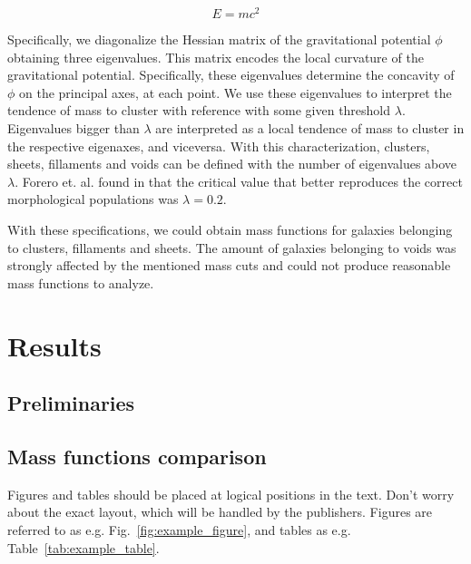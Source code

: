 \documentclass[a4paper,fleqn,usenatbib]{mnras}
\begin{document}
\begin{equation}
E =  mc^2
\label{eq:hessian}
\end{equation}

Specifically, we diagonalize the Hessian matrix of the gravitational
potential $\phi$ obtaining three eigenvalues.  
This matrix encodes the local curvature of the gravitational
potential.  
Specifically, these eigenvalues determine the concavity of $\phi$ on
the principal axes, at each point.  
We use these eigenvalues to interpret the tendence of mass to cluster
with reference with some given threshold $\lambda$.  
Eigenvalues bigger than $\lambda$ are interpreted as a local tendence
of mass to cluster in the respective eigenaxes, and viceversa.  
With this characterization, clusters, sheets, fillaments and voids can
be defined with the number of eigenvalues above $\lambda$. 
Forero et. al. found in \cite{Forero2009} that the critical value that
better reproduces the correct morphological populations was $\lambda =
0.2$. 

With these specifications, we could obtain mass functions for galaxies
belonging to clusters, fillaments and sheets. The amount of galaxies
belonging to voids was strongly affected by the mentioned mass cuts
and could not produce reasonable mass functions to analyze. 

\section{Results}
\subsection{Preliminaries}

\subsection{Mass functions comparison}

Figures and tables should be placed at logical positions in the text. Don't
worry about the exact layout, which will be handled by the publishers.
Figures are referred to as e.g. Fig.~\ref{fig:example_figure}, and tables as
e.g. Table~\ref{tab:example_table}.
\end{document}
